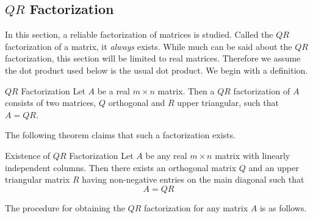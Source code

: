 \subsection{$QR$ Factorization}

In this section, a reliable factorization of matrices is studied. Called the $QR$ factorization of a matrix, it \textit{always} exists. While much can be said about the $QR$ factorization, this section will be limited to real matrices. Therefore we assume the dot product used below is the usual dot product. We begin with a definition. 

\begin{definition}{$QR$ Factorization}\label{def:qrfactorization}
Let $A$ be a real $m\times n$ matrix. Then a $QR$ factorization of $A$ consists
of two matrices, $Q$ orthogonal and $R$ upper
triangular, such that $A=QR.$  
\end{definition}

The following theorem claims that such a factorization exists. 

\begin{theorem}{Existence of $QR$ Factorization}\label{thm:existenceqr}
Let $A$ be any real $m\times n$ matrix with linearly independent columns. Then there exists an orthogonal
matrix $Q$ and an upper triangular matrix $R$ having non-negative entries
on the main diagonal such that
\begin{equation*}
A=QR
\end{equation*}
\end{theorem}

The procedure for obtaining the $QR$ factorization for any matrix $A$ is as follows.

